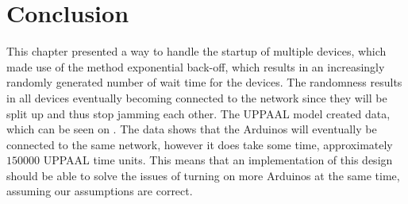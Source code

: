 \section{Conclusion}
This chapter presented a way to handle the startup of multiple devices, which made use of the method exponential back-off, which results in an increasingly randomly generated number of wait time for the devices. 
The randomness results in all devices eventually becoming connected to the network since they will be split up and thus stop jamming each other.
The UPPAAL model created data, which can be seen on .
The data shows that the Arduinos will eventually be connected to the same network, however it does take some time, approximately $150 000$ UPPAAL time units.
This means that an implementation of this design should be able to solve the issues of turning on more Arduinos at the same time, assuming our assumptions are correct.
